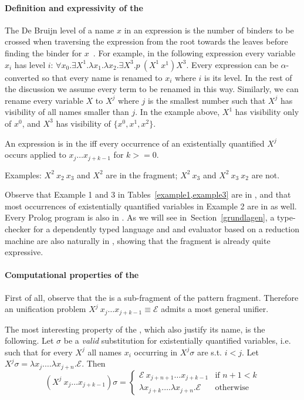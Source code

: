 \documentclass{llncs}
\begin{document}
\paragraph{Definition and expressivity of the \frag}
The De Bruijn level of a name $x$ in an expression is the number of binders to be crossed when traversing the expression from the root towards the leaves before finding the binder for $x$~\cite{debruijnlevel}. For example, in the following expression every variable $x_i$ has level $i$: $\forall x_0.\exists X^1.\lambda x_1.\lambda x_2. \exists X^3. p~(X^1~x^1) X^3$. Every expression can be
$\alpha$-converted so that every name is renamed to $x_i$ where $i$ is its level. In the rest of the discussion we assume every term to be renamed in this way. Similarly, we can rename every variable $X$ to $X^j$ where $j$ is the smallest number such that $X^j$ has visibility of all names smaller than $j$. In the example above, $X^1$ has visibility only of $x^0$, and $X^3$ has visibility of $\{x^0,x^1,x^2\}$.

An expression is in the \frag{} iff every occurrence of an existentially quantified $X^j$ occurs applied to $x_j \ldots x_{j+k-1}$ for $k >= 0$.

Examples: $X^2~x_2~x_3$ and $X^2$ are in the fragment; $X^2~x_3$ and $X^2~x_3~x_2$ are not.

Observe that Example 1 and 3 in Tables~\ref{example1,example3} are in \frag, and that most occurrences of existentially quantified variables in Example 2 are in \frag{} as well. Every Prolog program is also in \frag. As we will see in~Section~\ref{grundlagen}, a type-checker for a dependently typed language and and evaluator based on a reduction machine are also naturally in \frag, showing that the fragment is already quite expressive.

\paragraph{Computational properties of the \frag}
First of all, observe that the \frag{} is a sub-fragment of the pattern fragment. Therefore an unification problem $X^j~x_j\ldots x_{j+k-1} \equiv \mathcal{E}$ admits a most general unifier.

The most interesting property of the \frag, which also justify its name, is the following. Let $\sigma$ be a \emph{valid} substitution for existentially quantified variables, i.e. such that for every $X^j$ all names $x_i$ occurring in $X^j \sigma$ are s.t. $i < j$. Let $X^j \sigma = \lambda x_j. \ldots \lambda x_{j+n}.\mathcal{E}$. Then
\begin{equation}\label{deffrag}(X^j~x_j \ldots x_{j+k-1}) \sigma
 = \left\{ \begin{array}{ll}
\mathcal{E}~x_{j+n+1} \ldots x_{j+k-1} & \mbox{if $n+1 < k$} \\
\lambda x_{j+k}. \ldots \lambda x_{j+n}.\mathcal{E} & \mbox{otherwise}
      \end{array} \right.\end{equation}
\end{document}
